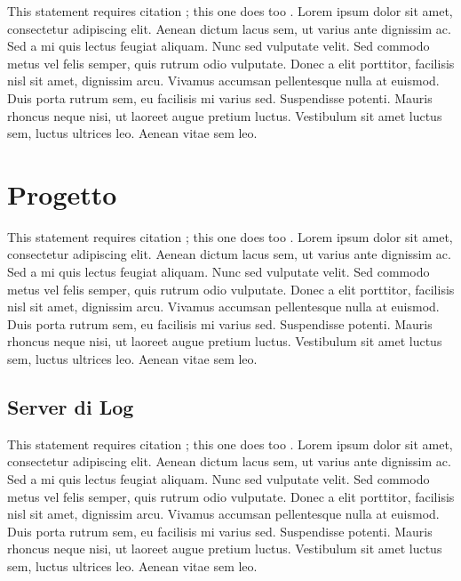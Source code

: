 \documentclass[a4paper, 11pt]{article} %
\begin{document}
This statement requires citation \cite{Smith:2012qr}; this one does too \cite{Smith:2013jd}. Lorem ipsum dolor sit amet, consectetur adipiscing elit. Aenean dictum lacus sem, ut varius ante dignissim ac. Sed a mi quis lectus feugiat aliquam. Nunc sed vulputate velit. Sed commodo metus vel felis semper, quis rutrum odio vulputate. Donec a elit porttitor, facilisis nisl sit amet, dignissim arcu. Vivamus accumsan pellentesque nulla at euismod. Duis porta rutrum sem, eu facilisis mi varius sed. Suspendisse potenti. Mauris rhoncus neque nisi, ut laoreet augue pretium luctus. Vestibulum sit amet luctus sem, luctus ultrices leo. Aenean vitae sem leo.


\newpage
\section{Progetto}

This statement requires citation \cite{Smith:2012qr}; this one does too \cite{Smith:2013jd}. Lorem ipsum dolor sit amet, consectetur adipiscing elit. Aenean dictum lacus sem, ut varius ante dignissim ac. Sed a mi quis lectus feugiat aliquam. Nunc sed vulputate velit. Sed commodo metus vel felis semper, quis rutrum odio vulputate. Donec a elit porttitor, facilisis nisl sit amet, dignissim arcu. Vivamus accumsan pellentesque nulla at euismod. Duis porta rutrum sem, eu facilisis mi varius sed. Suspendisse potenti. Mauris rhoncus neque nisi, ut laoreet augue pretium luctus. Vestibulum sit amet luctus sem, luctus ultrices leo. Aenean vitae sem leo.

\subsection{Server di Log}

This statement requires citation \cite{Smith:2012qr}; this one does too \cite{Smith:2013jd}. Lorem ipsum dolor sit amet, consectetur adipiscing elit. Aenean dictum lacus sem, ut varius ante dignissim ac. Sed a mi quis lectus feugiat aliquam. Nunc sed vulputate velit. Sed commodo metus vel felis semper, quis rutrum odio vulputate. Donec a elit porttitor, facilisis nisl sit amet, dignissim arcu. Vivamus accumsan pellentesque nulla at euismod. Duis porta rutrum sem, eu facilisis mi varius sed. Suspendisse potenti. Mauris rhoncus neque nisi, ut laoreet augue pretium luctus. Vestibulum sit amet luctus sem, luctus ultrices leo. Aenean vitae sem leo.
\end{document}
